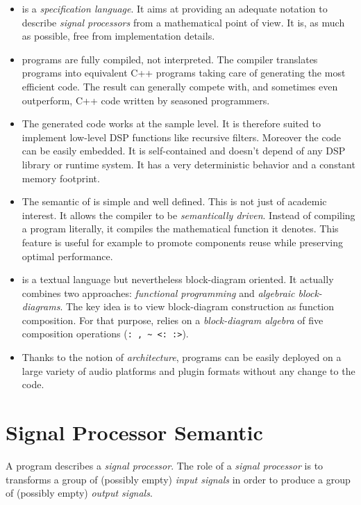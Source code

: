 \documentclass[a4paper]{book}
\begin{document}
\begin{itemize}

\item \faust is a \textit{specification language}. It aims at providing an adequate notation to describe \textit{signal processors} from a mathematical point of view. It is, as much as possible, free from implementation details. 

\item \faust programs are fully compiled, not interpreted. The compiler translates \faust programs into equivalent C++ programs taking care of generating the most efficient code. The result can generally compete with, and sometimes even outperform, C++ code written by seasoned programmers. 

\item The generated code works at the sample level. It is therefore suited to implement low-level DSP functions like recursive filters. Moreover the code can be easily embedded. It is self-contained and doesn't depend of any DSP library or runtime system. It has a very deterministic behavior and a constant memory footprint. 

\item The semantic of \faust is simple and well defined. This is not just of academic interest. It allows the \faust compiler to be \emph{semantically driven}. Instead of compiling a program literally, it compiles the mathematical function it denotes. This feature is useful for example to promote components reuse while preserving optimal performance.  

\item \faust is a textual language but nevertheless block-diagram oriented. It actually combines two approaches: \textit{functional programming} and \textit{algebraic block-diagrams}. The key idea is to view block-diagram construction as function composition. For that purpose, \faust relies on a \emph{block-diagram algebra} of five composition operations (\lstinline': , ~ <: :>').

\item Thanks to the notion of \textit{architecture}, \faust programs can be easily deployed on a large variety of audio platforms and plugin formats without any change to the \faust code.

\end{itemize}

\section{Signal Processor Semantic}
A \faust program describes a \emph{signal processor}. The role of a \textit{signal processor} is to transforms a group  of (possibly empty) \emph{input signals} in order to produce a group of (possibly empty) \emph{output signals}. 
\end{document}
